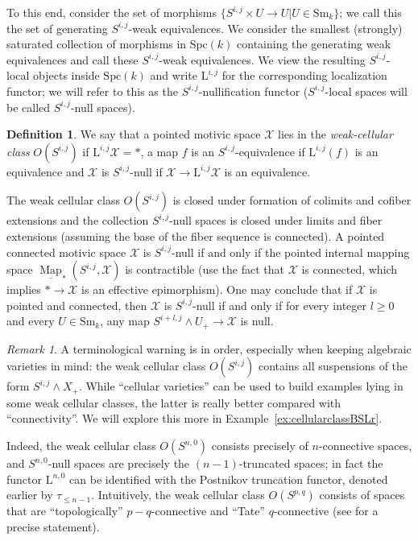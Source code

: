 \documentclass[11pt,leqno]{article}
\newcommand{\Map}{\operatorname{Map}}
\newcommand{\iMap}{\underline{\Map}}
\renewcommand{\1}{{\rm 1\hspace*{-0.4ex}%
\rule{0.1ex}{1.52ex}\hspace*{0.2ex}}}
\renewcommand{\L}{{\mathrm L}}
\newcommand{\Sm}{\mathrm{Sm}}
\newcommand{\Spc}{\mathrm{Spc}}
\newcommand{\<}[1]{{\langle}#1 {\rangle}}
\theoremstyle{plain}
\theoremstyle{definition}
\newtheorem{defn}[theorem]{Definition}
\theoremstyle{remark}
\newtheorem{rem}[theorem]{Remark}
\numberwithin{equation}{subsection}
\begin{document}
To this end, consider the set of morphisms $\{ S^{i,j} \times U \to U | U \in \Sm_k\}$; we call this the set of generating $S^{i,j}$-weak equivalences.  We consider the smallest (strongly) saturated collection of morphisms in $\Spc(k)$ containing the generating weak equivalences and call these $S^{i,j}$-weak equivalences.  We view the resulting $S^{i,j}$-local objects inside $\Spc(k)$ and write $\L^{i,j}$ for the corresponding localization functor; we will refer to this as the $S^{i,j}$-nullification functor ($S^{i,j}$-local spaces will be called $S^{i,j}$-null spaces).

\begin{defn}
	We say that a pointed motivic space $\mathscr{X}$ lies in the {\em weak-cellular class} $O(S^{i,j})$ if $\L^{i,j} \mathscr{X} = \ast$, a map $f$ is an $S^{i,j}$-equivalence if $\L^{i,j}(f)$ is an equivalence and $\mathscr{X}$ is $S^{i,j}$-null if $\mathscr{X} \to \L^{i,j} \mathscr{X}$ is an equivalence.
\end{defn}

The weak cellular class $O(S^{i,j})$ is closed under formation of colimits and cofiber extensions and the collection $S^{i,j}$-null spaces is closed under limits and fiber extensions (assuming the base of the fiber sequence is connected).  A pointed connected motivic space $\mathscr{X}$ is $S^{i,j}$-null if and only if the pointed internal mapping space $\iMap_*(S^{i,j},\mathscr{X})$ is contractible (use the fact that $\mathscr{X}$ is connected, which implies $\ast \to \mathscr{X}$ is an effective epimorphism).  One may conclude that if $\mathscr{X}$ is pointed and connected, then $\mathscr{X}$ is $S^{i,j}$-null if and only if for every integer $l \geq 0$ and every $U \in \Sm_k$, any map $S^{i+l,j} \wedge U_+ \to \mathscr{X}$ is null.  

\begin{rem}
	A terminological warning is in order, especially when keeping algebraic varieties in mind: the weak cellular class $O(S^{i,j})$ contains all suspensions of the form $S^{i,j} \wedge X_+$.  While ``cellular varieties'' can be used to build examples lying in some weak cellular classes, the latter is really better compared with ``connectivity''.  We will explore this more in Example~\ref{ex:cellularclassBSLr}.
	
	Indeed, the weak cellular class $O(S^{n,0})$ consists precisely of $n$-connective spaces, and $S^{n,0}$-null spaces are precisely the $(n-1)$-truncated spaces; in fact the functor $\L^{n,0}$ can be identified with the Postnikov truncation functor, denoted earlier by $\tau_{\leq {n-1}}$.  Intuitively, the weak cellular class $O(S^{p,q})$ consists of spaces that are ``topologically'' $p-q$-connective and ``Tate'' $q$-connective (see \cite[Corollary 3.1.27]{ABHFreudenthal} for a precise statement).
\end{rem}
\end{document}
